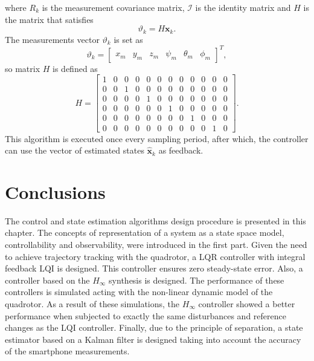 where $R_k$ is the measurement covariance matrix, $\mathcal{I}$ is the identity matrix and $H$ is the matrix that satisfies
\begin{equation}
\vartheta_k = H \mathbf{x}_k.
\end{equation}
The measurements vector $\vartheta_k$ is set as
\begin{equation}
\vartheta_k = \begin{bmatrix}
x_{m} & y_{m} & z_{m} & \psi_{m} & \theta_{m} & \phi_{m}
\end{bmatrix}^{T},
\end{equation}
so matrix $H$ is defined as
\begin{equation}\label{eqn:H}
H =\begin{bmatrix}
1 & 0 & 0 & 0 & 0 & 0 & 0 & 0 & 0 & 0 & 0 & 0\\
0 & 0 & 1 & 0 & 0 & 0 & 0 & 0 & 0 & 0 & 0 & 0\\
0 & 0 & 0 & 0 & 1 & 0 & 0 & 0 & 0 & 0 & 0 & 0\\
0 & 0 & 0 & 0 & 0 & 0 & 1 & 0 & 0 & 0 & 0 & 0\\
0 & 0 & 0 & 0 & 0 & 0 & 0 & 0 & 1 & 0 & 0 & 0\\
0 & 0 & 0 & 0 & 0 & 0 & 0 & 0 & 0 & 0 & 1 & 0
			\end{bmatrix}.
\end{equation}
This algorithm is executed once every sampling period, after which, the controller can use the vector of estimated states $\hat{\mathbf{x}}_{k}$ as feedback.



\section{Conclusions}
The control and state estimation algorithms design procedure is presented in this chapter. The concepts of representation of a system as a state space model, controllability and observability, were introduced in the first part. Given the need to achieve trajectory tracking with the quadrotor, a LQR controller with integral feedback LQI is designed. This controller ensures zero steady-state error. Also, a controller based on the $H_\infty$ synthesis is designed. The performance of these controllers is simulated acting with the non-linear dynamic model of the quadrotor. As a result of these simulations, the $H_\infty$ controller showed a better performance when subjected to exactly the same disturbances and reference changes as the LQI controller.
Finally, due to the principle of separation, a state estimator based on a Kalman filter is designed taking into account the accuracy of the smartphone measurements.